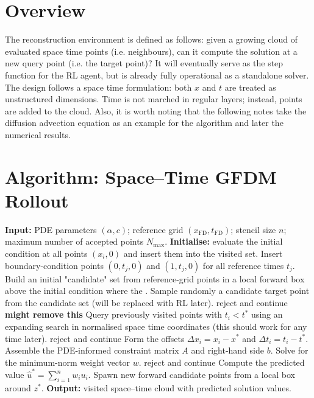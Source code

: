 \documentclass[12pt, a4paper, twoside]{report}
\theoremstyle{plain}
\theoremstyle{definition}
\begin{document}
\section{Overview}
\label{sec:recon_overview}
The reconstruction environment is defined as follows: given a growing cloud of evaluated space time points (i.e. neighbours), can it compute the solution at a new query point (i.e. the target point)? It will eventually serve as the step function for the RL agent, but is already fully operational as a standalone solver.
The design follows a space time formulation: both $x$ and $t$ are treated as unstructured dimensions.
Time is not marched in regular layers; instead, points are added to the cloud. Also, it is worth noting that the following notes take the diffusion advection equation as an example for the algorithm and later the numerical results.

\section{Algorithm: Space--Time GFDM Rollout}
\label{alg:algorithm}
\begin{algorithm}
\caption{Space--Time GFDM Rollout (current implementation)}
\begin{algorithmic}[1]
\State \textbf{Input:} PDE parameters $(\alpha,c)$; reference grid $(x_{\mathrm{FD}},t_{\mathrm{FD}})$; stencil size $n$; maximum number of accepted points $N_{\max}$.
\State \textbf{Initialise:} evaluate the initial condition at all points $(x_i,0)$ and insert them into the visited set.
\State Insert boundary-condition points $(0,t_j,0)$ and $(1,t_j,0)$ for all reference times $t_j$.
\State Build an initial "candidate" set from reference-grid points in a local forward box above the initial condition where the .
    \State Sample randomly a candidate target point from the candidate set (will be replaced with RL later).
        \State reject and continue
        \State\textbf{ might remove this}
    \EndIf
    \State Query previously visited points with $t_i < t^*$ using an expanding search in normalised space time coordinates (this should work for any time later).
        \State reject and continue
    \EndIf
    \State Form the offsets $\Delta x_i = x_i-x^*$ and $\Delta t_i = t_i-t^*$. 
    \State Assemble the PDE-informed constraint matrix $A$ and right-hand side $b$.
    \State Solve for the minimum-norm weight vector $w$.
        \State reject and continue
    \EndIf
    \State Compute the predicted value $\hat u^* = \sum_{i=1}^n w_i u_i$. 
    \State Spawn new forward candidate points from a local box around $z^*$.
\EndWhile
\State \textbf{Output:} visited space--time cloud with predicted solution values.
\end{algorithmic}
\end{algorithm}
\end{document}

